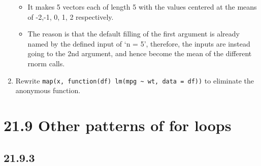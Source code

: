 \documentclass[]{book}
\newenvironment{Shaded}{\begin{snugshade}}{\end{snugshade}}
\newcommand{\DataTypeTok}[1]{\textcolor[rgb]{0.13,0.29,0.53}{#1}}
\newcommand{\KeywordTok}[1]{\textcolor[rgb]{0.13,0.29,0.53}{\textbf{#1}}}
\newcommand{\NormalTok}[1]{#1}
\newcommand{\OperatorTok}[1]{\textcolor[rgb]{0.81,0.36,0.00}{\textbf{#1}}}
\newcommand{\StringTok}[1]{\textcolor[rgb]{0.31,0.60,0.02}{#1}}
\providecommand{\tightlist}{%
  \setlength{\itemsep}{0pt}\setlength{\parskip}{0pt}}
\theoremstyle{definition}
\theoremstyle{definition}
\theoremstyle{definition}
\theoremstyle{remark}
\begin{document}
\begin{enumerate}
  \begin{itemize}
  \tightlist
  \item
    It makes 5 vectors each of length 5 with the values centered at the
    means of -2,-1, 0, 1, 2 respectively.
  \item
    The reason is that the default filling of the first argument is
    already named by the defined input of `n = 5', therefore, the inputs
    are instead going to the 2nd argument, and hence become the mean of
    the different rnorm calls.
  \end{itemize}
\item
  Rewrite
  \texttt{map(x,\ function(df)\ lm(mpg\ \textasciitilde{}\ wt,\ data\ =\ df))}
  to eliminate the anonymous function.
\end{enumerate}

\begin{Shaded}
\end{Shaded}

\hypertarget{other-patterns-of-for-loops}{%
\section{21.9 Other patterns of for
loops}\label{other-patterns-of-for-loops}}

\hypertarget{section-76}{%
\subsection{21.9.3}\label{section-76}}
\end{document}
